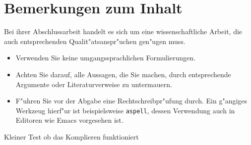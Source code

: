 \chapter{Bemerkungen zum Inhalt}
\label{c:inhalt}



Bei ihrer Abschlussarbeit handelt es sich um eine
  wissenschaftliche Arbeit, die auch entsprechenden
  Qualit"atsanspr"uchen gen"ugen muss.
  \begin{itemize}
  \item Verwenden Sie keine umgangssprachlichen Formulierungen.
  \item Achten Sie darauf, alle Aussagen, die Sie machen, durch
    entsprechende Argumente oder Literaturverweise zu untermauern.
  \item F"uhren Sie vor der Abgabe eine Rechtschreibpr"ufung durch.
    Ein g"angiges Werkzeug hierf"ur ist beispielsweise
    \texttt{aspell}, dessen Verwendung auch in Editoren wie Emacs
    vorgesehen ist.
  \end{itemize}


Kleiner Test ob das Komplieren funktioniert

